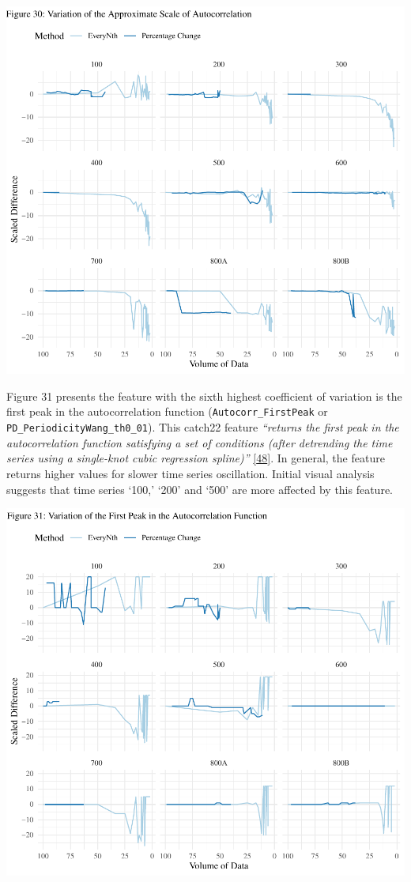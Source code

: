 \documentclass{article}
\begin{document}
\includegraphics{210431461_CSC8639_Dissertation_files/figure-latex/ApproxScale-1.pdf}

\newpage

Figure 31 presents the feature with the sixth highest coefficient of
variation is the first peak in the autocorrelation function
(\texttt{Autocorr\_FirstPeak} or \texttt{PD\_PeriodicityWang\_th0\_01}).
This catch22 feature \emph{``returns the first peak in the
autocorrelation function satisfying a set of conditions (after
detrending the time series using a single-knot cubic regression
spline)''} \protect\hyperlink{ref-feature_book}{{[}48{]}}. In general,
the feature returns higher values for slower time series oscillation.
Initial visual analysis suggests that time series `100,' `200' and `500'
are more affected by this feature.

\includegraphics{210431461_CSC8639_Dissertation_files/figure-latex/FirstPeak-1.pdf}
\end{document}
